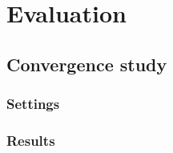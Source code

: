 \section{Evaluation}
\label{sec:evaluation}


\subsection{Convergence study}
\subsubsection{Settings}
\subsubsection{Results}
